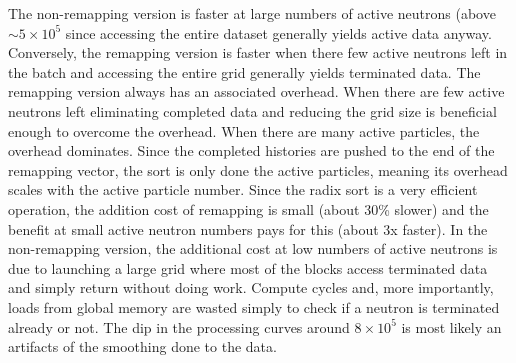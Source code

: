 The non-remapping version is faster at large numbers of active neutrons (above $\sim5 \times 10^{5}$ since accessing the entire dataset generally yields active data anyway.  Conversely, the remapping version is faster when there few active neutrons left in the batch and accessing the entire grid generally yields terminated data.  The remapping version always has an associated overhead. When there are few active neutrons left eliminating completed data and reducing the grid size is beneficial enough to overcome the overhead. When there are many active particles, the overhead dominates. Since the completed histories are pushed to the end of the remapping vector, the sort is only done the active particles, meaning its overhead scales with the active particle number.%
  Since the radix sort is a very efficient operation, the addition cost of remapping is small (about 30\% slower) and the benefit at small active neutron numbers pays for this (about 3x faster).   In the non-remapping version, the additional cost at low numbers of active neutrons is due to launching a large grid where most of the blocks access terminated data and simply return without doing work.  Compute cycles and, more importantly, loads from global memory are wasted simply to check if a neutron is terminated already or not.  The dip in the processing curves around $8\times10^5$  is most likely an artifacts of the smoothing done to the data.


